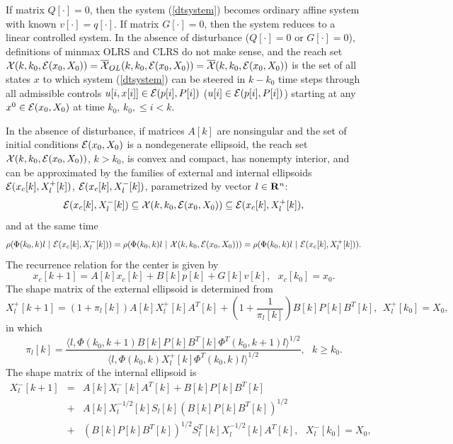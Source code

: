 \documentclass{report}
\newcommand{\EE}{{\cal E}}
\newcommand{\XX}{{\cal X}}
\begin{document}
If matrix $Q[\cdot]=0$, then the system (\ref{dtsystem}) becomes
ordinary affine system with known $v[\cdot]=q[\cdot]$.
If matrix $G[\cdot]=0$, then the system reduces to a linear controlled
system. In the absence of disturbance ($Q[\cdot]=0$ or $G[\cdot]=0$),
definitions of minmax OLRS and CLRS do not make sense, and the reach set
$\XX(k,k_0,\EE(x_0,X_0)) = \overline{\XX}_{OL}(k,k_0,\EE(x_0,X_0)) =
\overline{\XX}(k,k_0,\EE(x_0,X_0))$ is the set of all states $x$ to which
system (\ref{dtsystem}) can be steered in $k-k_0$ time steps through all
admissible controls $u[i,x[i]]\in\EE(p[i],P[i])$ ($u[i]\in\EE(p[i],P[i])$)
starting at any $x^0\in\EE(x_0,X_0)$ at time $k_0$, $k_0,\leq i<k$.

In the absence of disturbance, if matrices $A[k]$ are nonsingular
and the set of initial conditions $\EE(x_0,X_0)$ is a nondegenerate ellipsoid,
the reach set $\XX(k,k_0,\EE(x_0,X_0))$, $k>k_0$, is convex and compact,
has nonempty interior, and can be approximated by the families of
external and internal ellipsoids $\EE(x_c[k],X^+_l[k])$,
$\EE(x_c[k],X^-_l[k])$, parametrized by vector $l\in{\bf R}^n$:
\[ \EE(x_c[k], X^-_l[k]) \subseteq \XX(k,k_0,\EE(x_0,X_0)) \subseteq
\EE(x_c[k], X^+_l[k]), \]
and at the same time
\[ \rho(\Phi(k_0,k)l ~|~ \EE(x_c[k], X^-_l[k])) =
\rho(\Phi(k_0,k)l ~|~ \XX(k,k_0,\EE(x_0,X_0))) =
\rho(\Phi(k_0,k)l ~|~ \EE(x_c[k], X^+_l[k])). \]
The recurrence relation for the center is given by
\begin{equation}
x_c[k+1] = A[k]x_c[k] + B[k]p[k] + G[k]v[k], ~~~ x_c[k_0]=x_0.
\label{dfwdcenter}
\end{equation}
The shape matrix of the external ellipsoid is determined from
\begin{equation}
X^+_l[k+1] = (1+\pi_l[k])A[k]X^+_l[k]A^T[k] +
(1+\frac{1}{\pi_l[k]})B[k]P[k]B^T[k], ~~ X^+_l[k_0] = X_0, \label{dfwdext}
\end{equation}
in which
\begin{equation}
\pi_l[k] = \frac{\langle l,
\Phi(k_0,k+1)B[k]P[k]B^T[k]\Phi^T(k_0,k+1)l\rangle^{1/2}}{\langle l,
\Phi(k_0,k)X^+_l[k]\Phi^T(k_0,k)l\rangle^{1/2}}, ~~~ k\geq k_0.
\label{pidscrt}
\end{equation}
The shape matrix of the internal ellipsoid is
\begin{eqnarray}
X^-_l[k+1] & = & A[k]X^-_l[k]A^T[k] + B[k]P[k]B^T[k] \nonumber \\
& + & A[k]X^{-1/2}_l[k]S_l[k](B[k]P[k]B^T[k])^{1/2} \nonumber \\
& + & (B[k]P[k]B^T[k])^{1/2}S^T_l[k]X^{-1/2}_l[k]A^T[k], ~~~
X^-_l[k_0]=X_0, \label{dfwdint}
\end{eqnarray}
\end{document}
